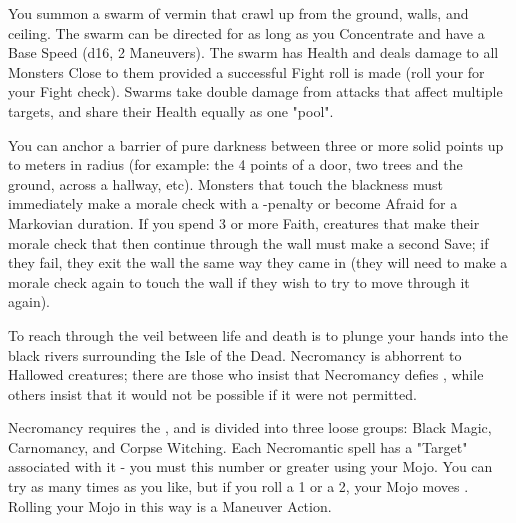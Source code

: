 {\MYSTERY [
  Name = Vermin Swarm,
  Link = arcana-mystery-vermin-swarm,
  Paradigm = Biomancy,
  Save = n/a,
  Duration = Concentration,
  Target = Close or Nearby
]

You summon a swarm of vermin that crawl up from the ground, walls, and ceiling.  The swarm can be directed for as long as you Concentrate and have a Base Speed (d16, 2 Maneuvers).  The swarm has \SUMDICE Health and deals \DICE damage to all Monsters Close to them provided a successful Fight roll is made (roll your \FOC for your Fight check).  Swarms take double damage from attacks that affect multiple targets, and share their Health equally as one "pool".  

\MYSTERY [
  Name = Wall of Gloom,
  Link = arcana-mystery-wall-of-gloom,
  Paradigm = Mind,
  Save = See Below,
  Duration = Markovian,
  Target = Nearby or Far-Away
]

You can anchor a barrier of pure darkness between three or more solid points up to \DICE meters in radius (for example: the 4 points of a door, two trees and the ground, across a hallway, etc).  Monsters that touch the blackness must immediately make a morale check with a -\DICE penalty or become Afraid for a Markovian duration.  If you spend 3 or more Faith, creatures that make their morale check that then continue through the wall must make a second Save; if they fail, they exit the wall the same way they came in (they will need to make a morale check again to touch the wall if they wish to try to move through it again).   

\newpage


To reach through the veil between life and death is to plunge your hands into the black rivers surrounding the Isle of the Dead.  Necromancy is abhorrent to Hallowed creatures; there are those who insist that Necromancy defies \TheAuthority, while others insist that it would not be possible if it were not permitted.  


Necromancy requires the , and is divided into three loose groups:  Black Magic, Carnomancy, and Corpse Witching.  Each Necromantic spell has a "Target" associated with it - you must this number or greater using your Mojo.  You can try as many times as you like, but if you roll a 1 or a 2, your Mojo moves \DCDOWN.  Rolling your Mojo in this way is a Maneuver Action.


}

